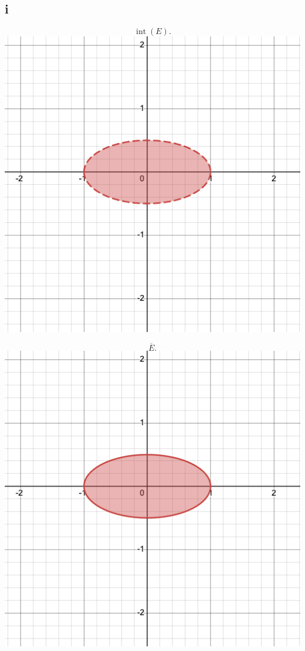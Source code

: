 \documentclass{eeleyes}
\newcommand\conj[1]{\overline{#1}}
\DeclareMathOperator{\interior}{int}
\begin{document}
\subsection*{i}
\begin{multicols}{3}
\begin{center}
    \[
        \interior(E)
    .\]
    \includegraphics[width=0.8\linewidth]{figures/i_img-1.png}
\end{center}

\columnbreak

\begin{center}
    \[
        \conj{E}
    .\]
    \includegraphics[width=0.8\linewidth]{figures/i_img-2.png}
\end{center}


\end{multicols}
\end{document}
